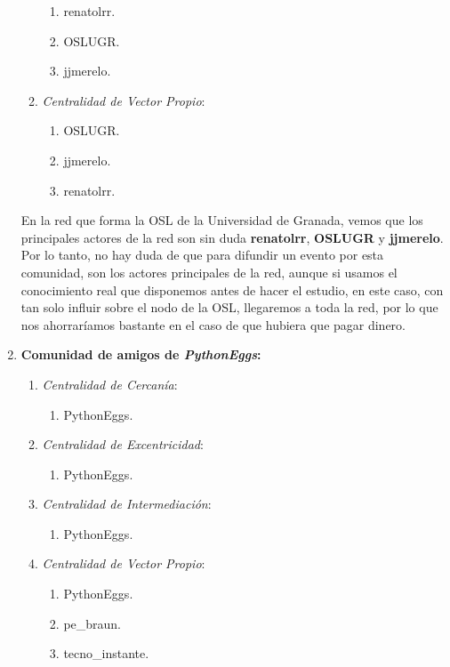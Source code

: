 \documentclass[paper=a4, fontsize=11pt]{article} %
\numberwithin{equation}{section} %
\numberwithin{figure}{section} %
\numberwithin{table}{section} %
\begin{document}
\begin{enumerate}[$\bullet$]
\begin{enumerate}[---]
\begin{enumerate}
      \item renatolrr.
      \item OSLUGR.
      \item jjmerelo.
    \end{enumerate}
    \item \textit{Centralidad de Vector Propio}:
    \begin{enumerate}
      \item OSLUGR.
      \item jjmerelo.
      \item renatolrr.
    \end{enumerate}
  \end{enumerate}
  En la red que forma la OSL de la Universidad de Granada, vemos que los principales actores de la red son sin duda \textbf{renatolrr}, \textbf{OSLUGR} y \textbf{jjmerelo}. Por lo tanto, no hay duda de que para difundir un evento por esta comunidad, son los actores principales de la red, aunque si usamos el conocimiento real que disponemos antes de hacer el estudio, en este caso, con tan solo influir sobre el nodo de la OSL, llegaremos a toda la red, por lo que nos ahorraríamos bastante en el caso de que hubiera que pagar dinero.
  \item \textbf{Comunidad de amigos de \textit{PythonEggs}:}
  \begin{enumerate}[---]
    \item \textit{Centralidad de Cercanía}:
    \begin{enumerate}
      \item PythonEggs.
    \end{enumerate}
    \item \textit{Centralidad de Excentricidad}:
    \begin{enumerate}
      \item PythonEggs.
    \end{enumerate}
    \item \textit{Centralidad de Intermediación}:
    \begin{enumerate}
      \item PythonEggs.
    \end{enumerate}
    \item \textit{Centralidad de Vector Propio}:
    \begin{enumerate}
      \item PythonEggs.
      \item pe\_braun.
      \item tecno\_instante.
    \end{enumerate}

\end{enumerate}
\end{enumerate}
\end{document}

